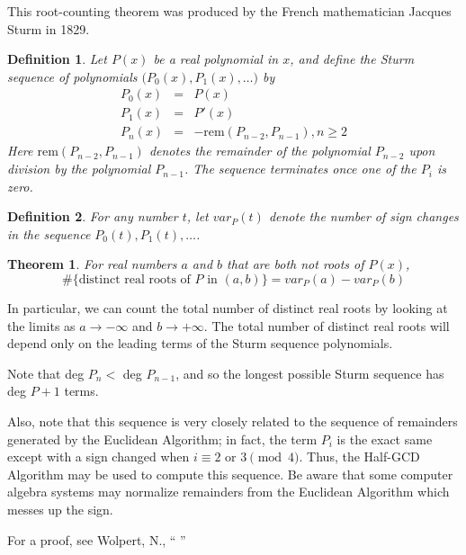 \documentclass[12pt]{article}
\newtheorem{theorem}{Theorem}
\newtheorem{definition}{Definition}
\begin{document}
This root-counting theorem was produced by the French mathematician Jacques Sturm in 1829.

\begin{definition}
Let $P(x)$ be a real polynomial in $x$, and define the
Sturm sequence of polynomials $\big(P_0(x), P_1(x), \ldots \big)$ by
\begin{eqnarray*}
P_0(x) &=& P(x)\\
P_1(x) &=& P'(x)\\
P_n(x) &=& -\mathrm{rem}(P_{n-2}, P_{n-1}), n \geq 2
\end{eqnarray*}
Here $\mathrm{rem}(P_{n-2}, P_{n-1})$ denotes the remainder of the
polynomial $P_{n-2}$ upon division by the polynomial $P_{n-1}$. The
sequence terminates once one of the $P_i$ is zero. 
\end{definition}

\begin{definition}
For any number
$t$, let $var_P(t)$ denote the number of sign changes in the
sequence $P_0(t), P_1(t), \ldots$. 
\end{definition}

\begin{theorem} For real numbers $a$ and $b$
that are both not roots of $P(x)$,
$$\#\{\textrm{distinct real roots of }P \textrm{ in } (a, b)\} = var_P(a)-var_P(b)$$
\end{theorem}

In particular, we can count the
total number of distinct real roots by looking at the limits as
$a\rightarrow-\infty$ and $b\rightarrow+\infty$. The total number of
distinct real roots will depend only on the leading terms of the
Sturm sequence polynomials.

Note that deg $P_n <$ deg $P_{n-1}$, and so the longest possible
Sturm sequence has deg $P+1$ terms.

Also, note that this sequence is very closely related to the sequence of remainders generated by the Euclidean Algorithm; in fact, the term $P_i$ is the exact same except with a sign changed when $i \equiv 2$ or $3 \pmod 4$. Thus, the Half-GCD Algorithm may be used to compute this sequence. Be aware that some computer algebra systems may normalize remainders from the Euclidean Algorithm which messes up the sign.

For a proof, see Wolpert, N., ``
''

\end{document}
